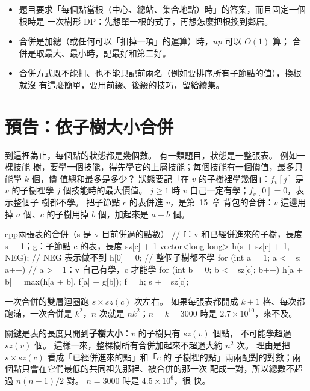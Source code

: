 \begin{itemize}
\item 題目要求「每個點當根（中心、總站、集合地點）時」的答案，而且固定一個根時是
一次樹形 DP：先想單一根的式子，再想怎麼把根換到鄰居。
\item 合併是加總（或任何可以「扣掉一項」的運算）時，$\mathit{up}$ 可以 $O(1)$ 算；
合併是取最大、最小時，記最好和第二好。
\item 合併方式既不能扣、也不能只記前兩名（例如要排序所有子節點的值），換根就沒
有這麼簡單，要用前綴、後綴的技巧，留給續集。
\end{itemize}

\section{預告：依子樹大小合併}
\label{sec:tdp-preview}

到這裡為止，每個點的狀態都是幾個數。 有一類題目，狀態是一整張表。 例如一棵技能
樹，要學一個技能，得先學它的上層技能；每個技能有一個價值，最多只能學 $k$ 個，價
值總和最多是多少？ 狀態要記「在 $v$ 的子樹裡學幾個」：$f_v[j]$ 是 $v$ 的子樹裡學
$j$ 個技能時的最大價值。 $j \ge 1$ 時 $v$ 自己一定有學；$f_v[0] = 0$，表示整個子
樹都不學。 把子節點 $c$ 的表併進 $v$，是第~15~章
背包的合併：$v$ 這邊用掉 $a$ 個、$c$ 的子樹用掉 $b$ 個，加起來是 $a + b$ 個。

\begin{code}{cpp}{兩張表的合併（s 是 v 目前併過的點數）}
// f：v 和已經併進來的子樹，長度 s + 1；g：子節點 c 的表，長度 sz[c] + 1
vector<long long> h(s + sz[c] + 1, NEG);   // NEG 表示做不到
h[0] = 0;                                  // 整個子樹都不學
for (int a = 1; a <= s; a++) {             // a >= 1：v 自己有學，c 才能學
    for (int b = 0; b <= sz[c]; b++) {
        h[a + b] = max(h[a + b], f[a] + g[b]);
    }
}
f = h;
s += sz[c];
\end{code}

一次合併的雙層迴圈跑 $s \times \mathit{sz}(c)$ 次左右。 如果每張表都開成 $k + 1$
格、每次都跑滿，一次合併是 $k^2$，$n$ 次就是 $n k^2$；$n = k = 3000$ 時是 $2.7
\times 10^{10}$，來不及。

關鍵是表的長度只開到\textbf{子樹大小}：$v$ 的子樹只有 $\mathit{sz}(v)$ 個點，
不可能學超過 $\mathit{sz}(v)$ 個。 這樣一來，整棵樹所有合併加起來不超過大約
$n^2$ 次。 理由是把 $s \times \mathit{sz}(c)$ 看成「已經併進來的點」和「$c$ 的
子樹裡的點」兩兩配對的對數；兩個點只會在它們最低的共同祖先那裡、被合併的那一次
配成一對，所以總數不超過 $n(n-1)/2$ 對。 $n = 3000$ 時是 $4.5 \times 10^6$，很
快。

